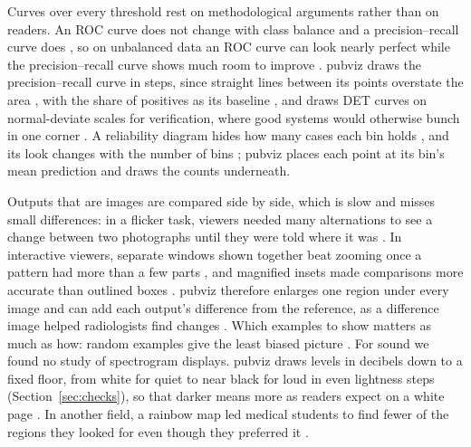 \documentclass[11pt]{article}
\begin{document}
Curves over every threshold rest on methodological arguments rather than on
readers. An ROC curve does not change with class balance and a
precision--recall curve does \citep[Sec.~4.2]{fawcett2006introduction}, so on
unbalanced data an ROC curve can look nearly perfect while the
precision--recall curve shows much room to improve
\citep[Fig.~1]{davis2006relationship}. pubviz draws the precision--recall curve
in steps, since straight lines between its points overstate the area
\citep[Sec.~4]{davis2006relationship}, with the share of positives as its
baseline \citep[p.~7]{saito2015precision}, and draws DET curves on
normal-deviate scales for verification, where good systems would otherwise
bunch in one corner \citep{martin1997det}. A reliability diagram hides how
many cases each bin holds \citep[Sec.~2]{guo2017calibration}, and its look
changes with the number of bins \citep[Fig.~2]{dimitriadis2021stable}; pubviz
places each point at its bin's mean prediction
\citep[Sec.~2]{brocker2007increasing} and draws the counts underneath.

Outputs that are images are compared side by side, which is slow and misses
small differences: in a flicker task, viewers needed many alternations to see
a change between two photographs until they were told where it was
\citep[p.~370]{rensink1997see}. In interactive viewers, separate windows shown
together beat zooming once a pattern had more than a few parts
\citep[Table~I]{plumlee2006zooming}, and magnified insets made comparisons more
accurate than outlined boxes \citep[Sec.~6.1]{lekschas2020pattern}. pubviz
therefore enlarges one region under every image and can add each output's
difference from the reference, as a difference image helped radiologists find
changes \citep[abstract]{difazio1997digital}. Which examples to show matters as
much as how: random examples give the least biased picture
\citep[Sec.~4.2]{vanmiltenburg2021underreporting}. For sound we found no study
of spectrogram displays. pubviz draws levels in decibels down to a fixed
floor, from white for quiet to near black for loud in even lightness steps
(Section~\ref{sec:checks}), so that darker means more as readers expect on a
white page \citep[Sec.~3]{schloss2019mapping}. In another field, a rainbow map
led medical students to find fewer of the regions they looked for even
though they preferred it \citep[Sec.~6.5]{borkin2011evaluation}.
\end{document}
